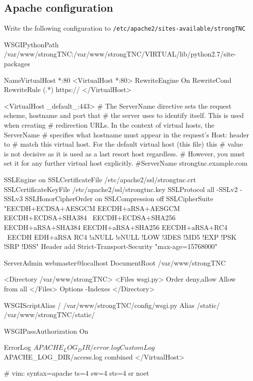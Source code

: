 \subsection*{Apache configuration}

Write the following configuration to \texttt{/etc/apache2/sites-available/strongTNC}

\begin{apachecode}
WSGIPythonPath /var/www/strongTNC:/var/www/strongTNC/VIRTUAL/lib/python2.7/site-packages

NameVirtualHost *:80
<VirtualHost *:80>
    RewriteEngine On
    RewriteCond %
    RewriteRule (.*) https://%
</VirtualHost>

<VirtualHost _default_:443>
    # The ServerName directive sets the request scheme, hostname and port that
    # the server uses to identify itself. This is used when creating
    # redirection URLs. In the context of virtual hosts, the ServerName
    # specifies what hostname must appear in the request's Host: header to
    # match this virtual host. For the default virtual host (this file) this
    # value is not decisive as it is used as a last resort host regardless.
    # However, you must set it for any further virtual host explicitly.
    #ServerName strongtnc.example.com

    SSLEngine on
    SSLCertificateFile /etc/apache2/ssl/strongtnc.crt
    SSLCertificateKeyFile /etc/apache2/ssl/strongtnc.key
    SSLProtocol all -SSLv2 -SSLv3
    SSLHonorCipherOrder on
    SSLCompression off
    SSLCipherSuite "EECDH+ECDSA+AESGCM EECDH+aRSA+AESGCM EECDH+ECDSA+SHA384 \
        EECDH+ECDSA+SHA256 EECDH+aRSA+SHA384 EECDH+aRSA+SHA256 EECDH+aRSA+RC4 \
        EECDH EDH+aRSA RC4 !aNULL !eNULL !LOW !3DES !MD5 !EXP !PSK !SRP !DSS"
    Header add Strict-Transport-Security "max-age=15768000"

    ServerAdmin webmaster@localhost
    DocumentRoot /var/www/strongTNC

    <Directory /var/www/strongTNC>
        <Files wsgi.py>
            Order deny,allow
            Allow from all
        </Files>
        Options -Indexes
    </Directory>

    WSGIScriptAlias / /var/www/strongTNC/config/wsgi.py
    Alias /static/ /var/www/strongTNC/static/

    WSGIPassAuthorization On

    ErrorLog ${APACHE_LOG_DIR}/error.log
    CustomLog ${APACHE_LOG_DIR}/access.log combined
</VirtualHost>

# vim: syntax=apache ts=4 sw=4 sts=4 sr noet
\end{apachecode}

